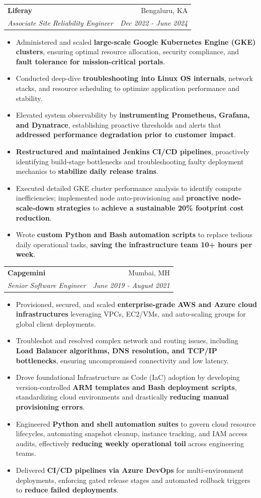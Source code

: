 \documentclass[letterpaper,11pt]{article}
\makeatletter
\newcommand{\resumeItemPlain}[1]{
  \item\small{
    {#1 \vspace{-2pt}}
  }
}
\newcommand{\resumeSubheading}[4]{
  \vspace{-1pt}\item
    \begin{tabular*}{0.97\textwidth}[t]{l@{\extracolsep{\fill}}r}
      \textbf{#1} & #2 \\
      \textit{\small#3} & \textit{\small #4} \\
    \end{tabular*}\vspace{-5pt}
}
\newcommand{\resumeItemListStart}{\begin{itemize}}
\newcommand{\resumeItemListEnd}{\end{itemize}\vspace{-5pt}}
\makeatother
\begin{document}
    \vspace{5pt}
    \resumeSubheading
      {Liferay}{Bengaluru, KA}
      {Associate Site Reliability Engineer}{Dec 2022 - June 2024}
      \resumeItemListStart
        \resumeItemPlain{Administered and scaled \textbf{large-scale Google Kubernetes Engine (GKE) clusters}, ensuring optimal resource allocation, security compliance, and \textbf{fault tolerance for mission-critical portals}.}
        \resumeItemPlain{Conducted deep-dive \textbf{troubleshooting into Linux OS internals}, network stacks, and resource scheduling to optimize application performance and stability.}
        \resumeItemPlain{Elevated system observability by \textbf{instrumenting Prometheus, Grafana, and Dynatrace}, establishing proactive thresholds and alerts that \textbf{addressed performance degradation prior to customer impact}.}
        \resumeItemPlain{\textbf{Restructured and maintained Jenkins CI/CD pipelines}, proactively identifying build-stage bottlenecks and troubleshooting faulty deployment mechanics to \textbf{stabilize daily release trains}.}
        \resumeItemPlain{Executed detailed GKE cluster performance analysis to identify compute inefficiencies; implemented node auto-provisioning and \textbf{proactive node-scale-down strategies} to \textbf{achieve a sustainable 20\% footprint cost reduction}.}
        \resumeItemPlain{Wrote \textbf{custom Python and Bash automation scripts} to replace tedious daily operational tasks, \textbf{saving the infrastructure team 10+ hours per week}.}
      \resumeItemListEnd

    \vspace{5pt}
    \resumeSubheading
      {Capgemini}{Mumbai, MH}
      {Senior Software Engineer}{June 2019 - August 2021}
      \resumeItemListStart
        \resumeItemPlain{Provisioned, secured, and scaled \textbf{enterprise-grade AWS and Azure cloud infrastructures} leveraging VPCs, EC2/VMs, and auto-scaling groups for global client deployments.}
        \resumeItemPlain{Troubleshot and resolved complex network and routing issues, including \textbf{Load Balancer algorithms, DNS resolution, and TCP/IP bottlenecks}, ensuring uncompromised connectivity and low latency.}
        \resumeItemPlain{Drove foundational Infrastructure as Code (IaC) adoption by developing version-controlled \textbf{ARM templates and Bash deployment scripts}, standardizing cloud environments and drastically \textbf{reducing manual provisioning errors}.}
        \resumeItemPlain{Engineered \textbf{Python and shell automation suites} to govern cloud resource lifecycles, automating snapshot cleanup, instance tracking, and IAM access audits, effectively \textbf{reducing weekly operational toil} across engineering teams.}
        \resumeItemPlain{Delivered \textbf{CI/CD pipelines via Azure DevOps} for multi-environment deployments, enforcing gated release stages and automated rollback triggers to \textbf{reduce failed deployments}.}
      \resumeItemListEnd
\end{document}

